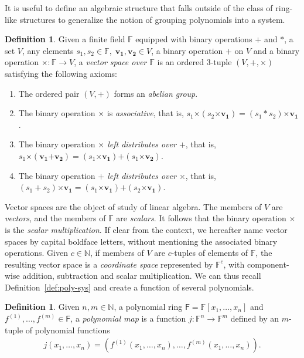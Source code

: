 \documentclass[12pt, a4paper, oneside]{memoir}
\theoremstyle{definition}
\newtheorem{definition}[theorem]{Definition}
\begin{document}
It is useful to define an algebraic structure that falls outside of the class of ring-like structures to generalize the notion of grouping polynomials into a system.

\begin{definition}
  Given a finite field $\mathbb{F}$ equipped with binary operations $+$ and $\ast$, a set $V$, any elements $s_{1}, s_{2} \in \mathbb{F},\; \mathbf{v_{1}}, \mathbf{v_{2}} \in V$, a binary operation $\bm{+}$ on $V$ and a binary operation $\bm{\times} : \mathbb{F} \to V$, a \emph{vector space over $\mathbb{F}$} is an ordered $3$-tuple $(V, \bm{+}, \bm{\times})$ satisfying the following axioms:
  
  \begin{enumerate}
    \item The ordered pair $(V, \bm{+})$ forms an \emph{abelian group}.
    \item The binary operation $\bm{\times}$ is \emph{associative}, that is, $s_{1} \bm{\times} (s_{2} \bm{\times} \mathbf{v_{1}}) = (s_{1} \ast s_{2}) \bm{\times} \mathbf{v_{1}}$.
    \item The binary operation \emph{$\bm{\times}$ left distributes over $\bm{+}$}, that is, $s_{1} \bm{\times} (\mathbf{v_{1}} \bm{+} \mathbf{v_{2}}) = (s_{1} \bm{\times} \mathbf{v_{1}}) \bm{+} (s_{1} \bm{\times} \mathbf{v_{2}})$.
    \item The binary operation \emph{$\bm{+}$ left distributes over $\bm{\times}$}, that is, $(s_{1} + s_{2}) \bm{\times} \mathbf{v_{1}} = (s_{1} \bm{\times} \mathbf{v_{1}}) \bm{+} (s_{2} \bm{\times} \mathbf{v_{1}})$.
  \end{enumerate}
\end{definition}

Vector spaces are the object of study of linear algebra. The members of $V$ are \emph{vectors}, and the members of $\mathbb{F}$ are \emph{scalars}. It follows that the binary operation $\bm{\times}$ is the \emph{scalar multiplication}. If clear from the context, we hereafter name vector spaces by capital boldface letters, without mentioning the associated binary operations. Given $c \in \mathbb{N}$, if members of $V$ are $c$-tuples of elements of $\mathbb{F}$, the resulting vector space is a \emph{coordinate space} represented by $\mathbb{F}^{c}$, with component-wise addition, subtraction and scalar multiplication. We can thus recall Definition~\ref{def:poly-sys} and create a function of several polynomials.

\begin{definition}\label{def:poly-map}
  Given $n, m \in \mathbb{N}$, a polynomial ring $\mathsf{F} = \mathbb{F}[x_{1}, \dots, x_{n}]$ and $f^{(1)}, \dots, f^{(m)} \in \mathsf{F}$, a \emph{polynomial map} is a function $j : \mathbb{F}^{n} \to \mathbb{F}^{m}$ defined by an $m$-tuple of polynomial functions
  \begin{align}
    j(x_{1}, \dots, x_{n}) = (f^{(1)}(x_{1}, \dots, x_{n}), \dots, f^{(m)}(x_{1}, \dots, x_{n})).
  \end{align}
\end{definition}
\end{document}
